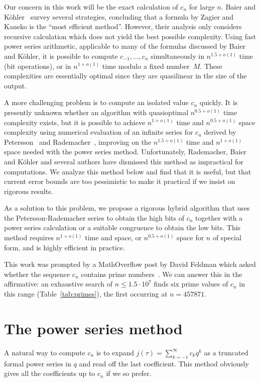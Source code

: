 \documentclass{amsart}
\theoremstyle{definition}
\theoremstyle{remark}
\begin{document}
Our concern in this work will be the exact calculation
of $c_n$ for large $n$.
Baier and K\"{o}hler~\cite{Baier2003} survey several strategies,
concluding that a formula by Zagier and Kaneko
is the ``most efficient method''.
However, their analysis only considers
recursive calculation which does not yield the best
possible complexity. Using fast power series
arithmetic, applicable to many of the formulas
discussed by Baier and K\"{o}hler, it is possible to compute
$c_{-1},\ldots,c_n$ simultaneously in $n^{1.5+o(1)}$ time (bit operations),
or in $n^{1+o(1)}$ time modulo a fixed number~$M$.
These complexities are essentially optimal
since they are quasilinear in the size of the output.

A more challenging problem is to compute an isolated
value $c_n$ quickly.
It is presently unknown whether an algorithm with
quasioptimal
$n^{0.5+o(1)}$ time complexity exists,
but it is possible to achieve 
$n^{1+o(1)}$ time and $n^{0.5+o(1)}$ space complexity
using numerical evaluation of an infinite series for $c_n$ derived
by Petersson~\cite{petersson1932} and Rademacher~\cite{Rademacher1938},
improving on the
$n^{1.5+o(1)}$ time and $n^{1+o(1)}$ space
needed with the power series method.
Unfortunately, Rademacher, Baier and K\"{o}hler
and several authors have dismissed this method
as impractical for computations.
We analyze this method below and find that it is useful,
but that current error bounds are too pessimistic to make it practical
if we insist on rigorous results.

As a solution to this problem, we propose a rigorous hybrid algorithm
that uses the Petersson-Rademacher series
to obtain the high bits of $c_n$ together with a
power series calculation or a suitable congruence
to obtain the low bits.
This method requires $n^{1+o(1)}$ time and space,
or $n^{0.5+o(1)}$ space for $n$ of special form,
and is highly efficient in practice.

This work was prompted by a MathOverflow post by David Feldman
which asked whether the sequence $c_n$ contains prime numbers~\cite{MO2}.
We can answer this in the affirmative: an
exhaustive search of $n \le 1.5 \cdot 10^7$
finds six prime values of $c_n$ in this range (Table~\ref{tab:primes}), the first
occurring at $n = 457871$.

\section{The power series method}

A natural way to compute $c_n$ is to
expand $j(\tau) = \sum_{k=-1}^{\infty} c_k q^k$ as a truncated formal power series
in $q$ and read off the last coefficient.
This method obviously gives all the coefficients up to $c_n$ if
we so prefer.
\end{document}

